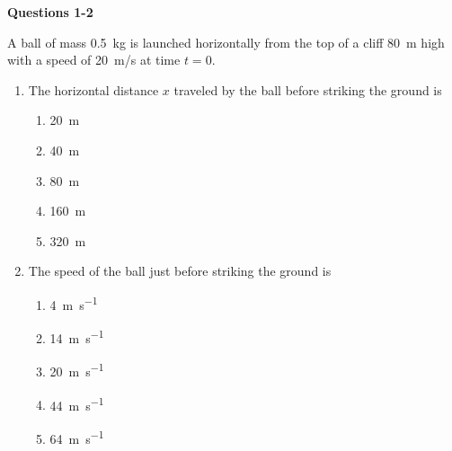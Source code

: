 \documentclass{../../oss-apphys}
\begin{document}
\genheader


\genmultidirections

\gengravity

\raggedcolumns
\begin{multicols}{2}

  \textbf{Questions 1-2}
  
  A ball of mass \SI{.5}{\kilo\gram} is launched horizontally from the top of a
  cliff \SI{80}{m} high with a speed of \SI{20}{m/s} at time $t=0$.
  \begin{center}
  \end{center}
  \begin{enumerate}[leftmargin=18pt]
  \item The horizontal distance $x$ traveled by the ball before striking the
    ground is
    \begin{enumerate}[noitemsep,topsep=0pt,leftmargin=18pt,label=(\Alph*)]
    \item\SI{20 }{\metre}
    \item\SI{40 }{\metre}
    \item\SI{80 }{\metre} 
    \item\SI{160}{\metre}
    \item\SI{320}{\metre}
    \end{enumerate}

  \item The speed of the ball just before striking the ground is
    \begin{enumerate}[noitemsep,topsep=0pt,leftmargin=18pt,label=(\Alph*)]
    \item\SI{4 }{\metre\per\second}
    \item\SI{14}{\metre\per\second}
    \item\SI{20}{\metre\per\second}
    \item\SI{44}{\metre\per\second}
    \item\SI{64}{\metre\per\second}
    \end{enumerate}
  \end{enumerate}


\end{multicols}
\end{document}
